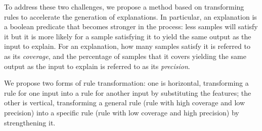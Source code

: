 To address these two challenges, we propose a method based on transforming rules to accelerate the generation of explanations. 
%
In particular, an explanation is a boolean predicate that becomes stronger in the process: less samples will satisfy it but it is more likely for a sample satisfying it to yield the same output as the input to explain.
%
For an explanation, how many samples satisfy it is referred to as its \emph{coverage}, and the percentage of samples that it covers yielding the same output as the input to explain is referred to as its \emph{precision}.

We propose two forms of rule transformation: one is horizontal, transforming a rule for one input into a rule for another input by substituting the features; the other is 
vertical, transforming a general rule (rule with high coverage and low precision) into a specific rule (rule with low coverage and high precision) by strengthening it.




